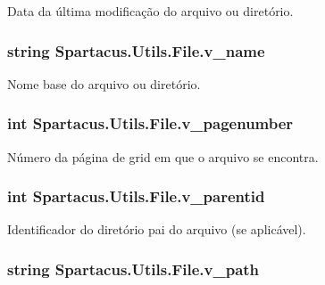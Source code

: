 Data da última modificação do arquivo ou diretório. 

\hypertarget{classSpartacus_1_1Utils_1_1File_a080b095e2b7aa8e1e6afaeff1ab8f453}{
\subsubsection[{v\+\_\+name}]{\setlength{\rightskip}{0pt plus 5cm}string Spartacus.\+Utils.\+File.\+v\+\_\+name}}\label{classSpartacus_1_1Utils_1_1File_a080b095e2b7aa8e1e6afaeff1ab8f453}


Nome base do arquivo ou diretório. 

\hypertarget{classSpartacus_1_1Utils_1_1File_a02b1d6f67f6718b43807e120244fcf4f}{
\subsubsection[{v\+\_\+pagenumber}]{\setlength{\rightskip}{0pt plus 5cm}int Spartacus.\+Utils.\+File.\+v\+\_\+pagenumber}}\label{classSpartacus_1_1Utils_1_1File_a02b1d6f67f6718b43807e120244fcf4f}


Número da página de grid em que o arquivo se encontra. 

\hypertarget{classSpartacus_1_1Utils_1_1File_a645b1c73f5a3bac42a4ceb6fc1bdb06b}{
\subsubsection[{v\+\_\+parentid}]{\setlength{\rightskip}{0pt plus 5cm}int Spartacus.\+Utils.\+File.\+v\+\_\+parentid}}\label{classSpartacus_1_1Utils_1_1File_a645b1c73f5a3bac42a4ceb6fc1bdb06b}


Identificador do diretório pai do arquivo (se aplicável). 

\hypertarget{classSpartacus_1_1Utils_1_1File_a8f91c323ee7ab05e66c18d2006a6569a}{
\subsubsection[{v\+\_\+path}]{\setlength{\rightskip}{0pt plus 5cm}string Spartacus.\+Utils.\+File.\+v\+\_\+path}}\label{classSpartacus_1_1Utils_1_1File_a8f91c323ee7ab05e66c18d2006a6569a}


